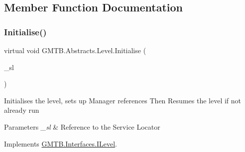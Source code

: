 \subsection{Member Function Documentation}
\mbox{\label{class_g_m_t_b_1_1_abstracts_1_1_level_a0048401bb0fb66b0fb0c19b3b25e4265}} 
\subsubsection{\texorpdfstring{Initialise()}{Initialise()}\hspace{0.1cm}{\footnotesize\ttfamily [1/2]}}
{\footnotesize\ttfamily virtual void G\+M\+T\+B.\+Abstracts.\+Level.\+Initialise (\begin{DoxyParamCaption}\item[{\mbox{\hyperlink{interface_g_m_t_b_1_1_interfaces_1_1_i_service_locator}{I\+Service\+Locator}}}]{\+\_\+sl }\end{DoxyParamCaption})\hspace{0.3cm}{\ttfamily [virtual]}}



Initialises the level, sets up Manager references Then Resumes the level if not already run 


\begin{DoxyParams}{Parameters}
{\em \+\_\+sl} & Reference to the Service Locator \\
\hline
\end{DoxyParams}


Implements \mbox{\hyperlink{interface_g_m_t_b_1_1_interfaces_1_1_i_level}{G\+M\+T\+B.\+Interfaces.\+I\+Level}}.



